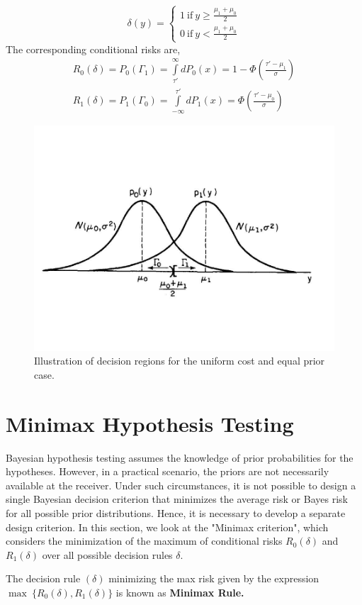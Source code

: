 \documentclass[a4paper,english,12pt]{article}
\begin{document}
\begin{exmp}
\begin{equation}
\delta(y)= \begin{cases}
1 ~ \mbox{if}~  y \ge \frac{{{\mu_1} + {\mu_0}}}{2}\\
0 ~ \mbox{if}~ y < \frac{{{\mu_1} + {\mu_0}}}{2}
\end{cases}
\end{equation}
The corresponding conditional risks are,
\begin{eqnarray}\nonumber
R_0(\delta)= P_0(\Gamma_1)
=\int\limits_{{\tau'}}^\infty  {d{P_0}(x)}
=1 - \Phi \left(\frac{{\tau'-\mu_1}}{\sigma }\right)\\
R_1(\delta)= P_1(\Gamma_0)
=\int\limits_{-\infty}^{\tau'}  {d{P_1}(x)}
=\Phi \left(\frac{{\tau'-\mu_0}}{\sigma }\right)
\end{eqnarray}
\begin{figure}[h]
\centering
\includegraphics[trim={0 5cm 0 7cm}, width=0.9\linewidth]{Figures/gaussian_error}
\caption{Illustration of decision regions for the uniform cost and equal prior case.}
\label{fig:gaussianerror}
\end{figure}
\end{exmp}
\section{Minimax Hypothesis Testing}
Bayesian hypothesis testing assumes the knowledge of prior probabilities for the hypotheses. However, in a practical scenario, the priors are not necessarily available at the receiver. Under such circumstances, it is not possible to design a single Bayesian decision criterion that minimizes the average risk or Bayes risk for all possible prior distributions. Hence, it is necessary to develop a separate design criterion. In this section, we look at the "Minimax criterion", which considers the minimization of the maximum of conditional risks $R_0(\delta)$ and $R_1(\delta)$ over all possible decision rules $\delta$. 
\begin{defn}
The decision rule $(\delta)$ minimizing the max risk given by the expression $\max~\{R_0(\delta),R_1(\delta)\}$ is known as \textbf{Minimax Rule.}
\end{defn}
\end{document}
